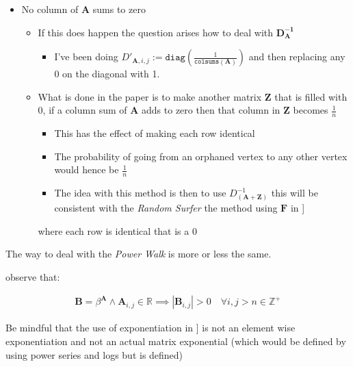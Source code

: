 \documentclass[11pt]{article}
\begin{document}
\begin{itemize}
\item No column of \(\mathbf{A}\) sums to zero

\begin{itemize}
\item If this does happen the question arises how to deal with
\(\mathbf{D_\mathbf{A}^{- 1}}\)

\begin{itemize}
\item I've been doing
\(D'_{\mathbf{A}, i, j} := \mathtt{diag} \left( {\frac{1}{\mathtt{colsums}\left( \mathbf{A} \right)}} \right)\)
and then replacing any \(0\) on the diagonal with 1.
\end{itemize}

\item What is done in the paper is to make another matrix \(\mathbf{Z}\)
that is filled with 0, if a column sum of \(\mathbf{A}\) adds to zero
then that column in \(\mathbf{Z}\) becomes \(\frac{1}{n}\)

\begin{itemize}
\item This has the effect of making each row identical

\item The probability of going from an orphaned vertex to any other
vertex would hence be \(\frac{1}{n}\)

\item The idea with this method is then to use
\(D_\mathbf{\left( A+Z \right)}^{- 1}\) this will be consistent with
the \emph{Random Surfer} the method using \(\mathbf{F}\) in
]
\end{itemize}

where each row is identical that is a 0
\end{itemize}
\end{itemize}

The way to deal with the \emph{Power Walk} is more or less the same.

observe that:

$$\begin{aligned}
    \mathbf{B} = \beta^{\mathbf{A}} \wedge \mathbf{A}_{i, j}\in \mathbb{R}  \implies  \left\lvert \mathbf{B}_{i, j} \right\rvert > 0 \quad \forall i,j>n\in \mathbb{Z}^+ \label{eq:b-is-pos}\end{aligned}$$

Be mindful that the use of exponentiation in
] is not an element wise exponentiation
and not an actual matrix exponential (which would be defined by using
power series and logs but is defined)
\end{document}
